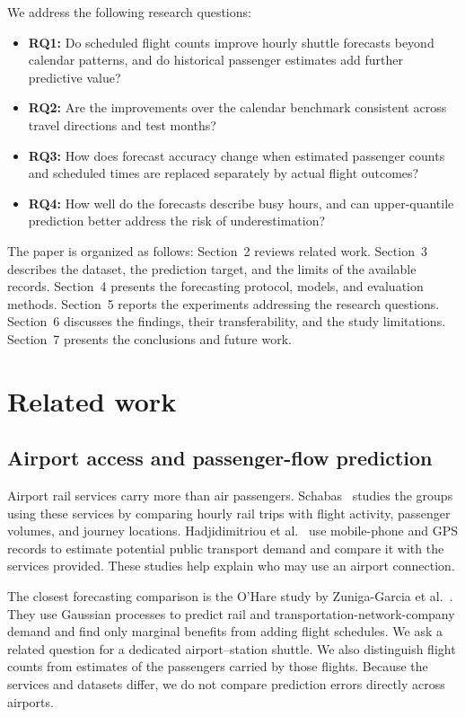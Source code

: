 \documentclass[preprint,12pt,times]{elsarticle}
\begin{document}
We address the following research questions:
\begin{itemize}
\item \textbf{RQ1:} Do scheduled flight counts improve hourly shuttle forecasts beyond calendar patterns, and do historical passenger estimates add further predictive value?
\item \textbf{RQ2:} Are the improvements over the calendar benchmark consistent across travel directions and test months?
\item \textbf{RQ3:} How does forecast accuracy change when estimated passenger counts and scheduled times are replaced separately by actual flight outcomes?
\item \textbf{RQ4:} How well do the forecasts describe busy hours, and can upper-quantile prediction better address the risk of underestimation?
\end{itemize}

The paper is organized as follows: Section~2 reviews related work. Section~3 describes the dataset, the prediction target, and the limits of the available records. Section~4 presents the forecasting protocol, models, and evaluation methods. Section~5 reports the experiments addressing the research questions. Section~6 discusses the findings, their transferability, and the study limitations. Section~7 presents the conclusions and future work.

\section{Related work}
\subsection{Airport access and passenger-flow prediction}
Airport rail services carry more than air passengers. Schabas~\cite{schabas} studies the groups using these services by comparing hourly rail trips with flight activity, passenger volumes, and journey locations. Hadjidimitriou et al.~\cite{hadjidimitriou2021demand} use mobile-phone and GPS records to estimate potential public transport demand and compare it with the services provided. These studies help explain who may use an airport connection.

The closest forecasting comparison is the O'Hare study by Zuniga-Garcia et al.~\cite{ohare}. They use Gaussian processes to predict rail and transportation-network-company demand and find only marginal benefits from adding flight schedules. We ask a related question for a dedicated airport--station shuttle. We also distinguish flight counts from estimates of the passengers carried by those flights. Because the services and datasets differ, we do not compare prediction errors directly across airports.
\end{document}
